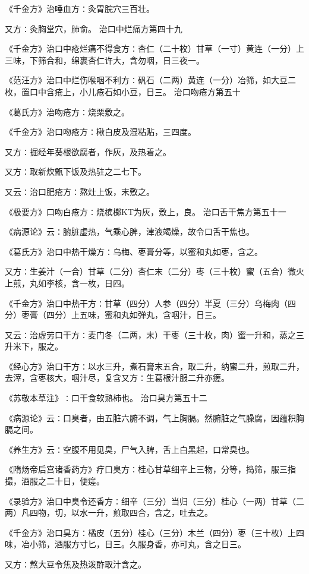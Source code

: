 \documentclass[a4paper,12pt,UTF8,twoside]{ctexbook}
\begin{document}
《千金方》治唾血方∶灸胃脘穴三百壮。

又方∶灸胸堂穴，肺俞。
治口中烂痛方第四十九

《千金方》治口中疮烂痛不得食方∶杏仁（二十枚）甘草（一寸）黄连（一分）上三味，下筛合和，绵裹杏仁许大，含勿咽，日三夜一。

《范汪方》治口中烂伤喉咽不利方∶矾石（二两）黄连（一分）冶筛，如大豆二枚，置口中含疮上，小儿疮石如小豆，日三。
治口吻疮方第五十

《葛氏方》治吻疮方∶烧栗敷之。

《千金方》治口吻疮方∶楸白皮及湿粘贴，三四度。

又方∶掘经年葵根欲腐者，作灰，及热着之。

又方∶取新炊甑下饭及热驻之二七下。

又云∶治口肥疮方∶熬灶上饭，末敷之。

《极要方》口吻白疮方∶烧槟榔KT为灰，敷上，良。
治口舌干焦方第五十一

《病源论》云∶腑脏虚热，气乘心脾，津液竭燥，故令口舌干焦也。

《葛氏方》治口中热干燥方∶乌梅、枣膏分等，以蜜和丸如枣，含之。

又方∶生姜汁（一合）甘草（二分）杏仁末（二分）枣（三十枚）蜜（五合）微火上煎，丸如李核，含一枚，日四。

《千金方》治口中热干方∶甘草（四分）人参（四分）半夏（三分）乌梅肉（四分）枣膏（四分）上五味，蜜和丸如弹丸，含咽汁，日三。

又云∶治虚劳口干方∶麦门冬（二两，末）干枣（三十枚，肉）蜜一升和，蒸之三升米下，服之。

《经心方》治口干方∶以水三升，煮石膏末五合，取二升，纳蜜二升，煎取二升，去滓，含枣核大，咽汁尽，复含又方∶生葛根汁服二升亦瘥。

《苏敬本草注》∶口干食软熟柿也。
治口臭方第五十二

《病源论》云∶口臭者，由五脏六腑不调，气上胸膈。然腑脏之气臊腐，因蕴积胸膈之间。

《养生方》云∶空腹不用见臭，尸气入脾，舌上白黑起，口常臭也。

《隋炀帝后宫诸香药方》疗口臭方∶桂心甘草细辛上三物，分等，捣筛，服三指撮，酒服之二十日，便瘥。

《录验方》治口中臭令还香方∶细辛（三分）当归（三分）桂心（一两）甘草（二两）凡四物，切，以水一升，煎取四合，含之，吐去之。

《千金方》治口臭方∶橘皮（五分）桂心（三分）木兰（四分）枣（三十枚）上四味，冶小筛，酒服方寸匕，日三。久服身香，亦可丸，含之日三。

又方∶熬大豆令焦及热泼酢取汁含之。
\end{document}
